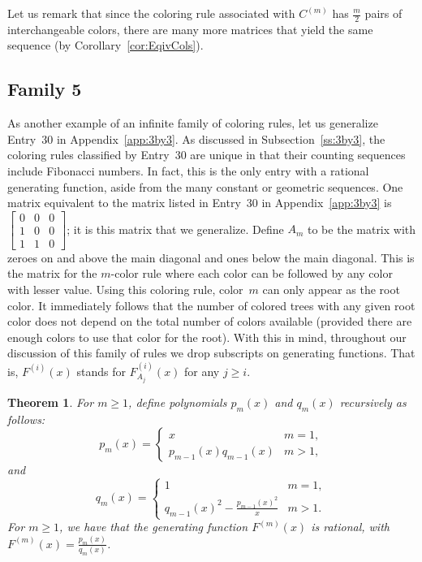 \documentclass[12pt]{amsart}
\newtheorem{theorem}{Theorem}
\newcommand{\gff}[2]{F_{#2}^{(#1)}(x)}
\newcommand{\gfnoa}[1]{F^{(#1)}(x)}
\begin{document}
Let us remark that since the coloring rule associated with $C^{(m)}$ has $\frac{m}{2}$ pairs of interchangeable colors, there are many more matrices that yield the same sequence (by Corollary~\ref{cor:EqivCols}).


\subsection{Family 5}

As another example of an infinite family of coloring rules, let us generalize Entry~30 in Appendix~\ref{app:3by3}. As discussed in Subsection~\ref{ss:3by3}, the coloring rules classified by Entry~30 are unique in that their counting sequences include Fibonacci numbers. In fact, this is the only entry with a rational generating function, aside from the many constant or geometric sequences.
One matrix equivalent to the matrix listed in Entry~30 in Appendix~\ref{app:3by3} is $\begin{bmatrix}
    0&0&0\\
    1&0&0\\
    1&1&0
\end{bmatrix}$; it is this matrix that we generalize. Define $A_m$ to be the matrix with zeroes on and above the main diagonal and ones below the main diagonal. This is the matrix for the $m$-color rule where each color can be followed by any color with lesser value. Using this coloring rule, color~$m$ can only appear as the root color. It immediately follows that the number of colored trees with any given root color does not depend on the total number of colors available (provided there are enough colors to use that color for the root). With this in mind, throughout our discussion of this family of rules we drop subscripts on generating functions. That is, $\gfnoa{i}$ stands for $\gff{i}{A_j}$ for any $j\geq i$.
\begin{theorem}\label{thm:genfib}
    For $m\geq1$, define polynomials $p_m(x)$ and $q_m(x)$ recursively as follows:
    \[
    p_m(x)=\begin{cases}
        x & m = 1,\\
        p_{m-1}(x)q_{m-1}(x) & m>1,
    \end{cases}\]
and
    \[q_m(x)=\begin{cases}
        1 & m = 1,\\
        q_{m-1}(x)^2-\frac{p_{m-1}(x)^2}{x} & m>1.
    \end{cases}
    \]
    For $m\geq1$, we have that the generating function $\gfnoa{m}$ is rational, with $\gfnoa{m}=\frac{p_m(x)}{q_m(x)}$.
\end{theorem}
\end{document}
